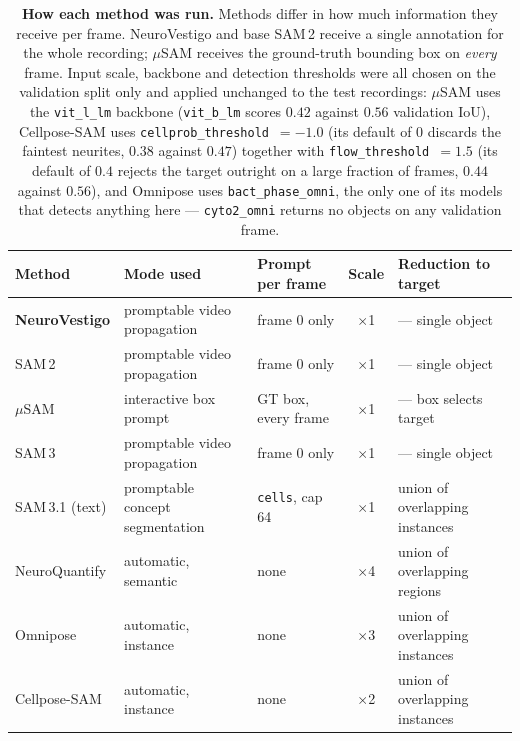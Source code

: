 \documentclass[11pt,a4paper]{article}
\begin{document}
\begin{table}[!htb]
\centering
\caption{\textbf{How each method was run.} Methods differ in how much
information they receive per frame. NeuroVestigo and base SAM\,2 receive a
single annotation for the whole recording; $\mu$SAM receives the
ground-truth bounding box on \emph{every} frame. Input scale, backbone and
detection thresholds were all chosen on the validation split only and applied
unchanged to the test recordings: $\mu$SAM uses the \texttt{vit\_l\_lm}
backbone (\texttt{vit\_b\_lm} scores $0.42$ against $0.56$ validation IoU),
Cellpose-SAM uses \texttt{cellprob\_threshold}~$=-1.0$ (its default of $0$
discards the faintest neurites, $0.38$ against $0.47$) together with
\texttt{flow\_threshold}~$=1.5$ (its default of $0.4$ rejects the target
outright on a large fraction of frames, $0.44$ against $0.56$), and Omnipose
uses
\texttt{bact\_phase\_omni}, the only one of its models that detects anything
here --- \texttt{cyto2\_omni} returns no objects on any validation frame.}
\label{tab:protocol}
\small
\begin{tabular}{l L{2.9cm} L{2.8cm} c L{3.2cm}}
\toprule
Method & Mode used & Prompt per frame & Scale & Reduction to target \\
\midrule
\textbf{NeuroVestigo}      & promptable video propagation & frame 0 only        & $\times$1 & --- single object \\
SAM\,2             & promptable video propagation & frame 0 only        & $\times$1 & --- single object \\
$\mu$SAM           & interactive box prompt       & GT box, every frame & $\times$1 & --- box selects target \\
SAM\,3             & promptable video propagation & frame 0 only        & $\times$1 & --- single object \\
SAM\,3.1 (text)    & promptable concept segmentation & \texttt{cells}, cap 64 & $\times$1 & union of overlapping instances \\
NeuroQuantify      & automatic, semantic          & none                & $\times$4 & union of overlapping regions \\
Omnipose           & automatic, instance          & none                & $\times$3 & union of overlapping instances \\
Cellpose-SAM       & automatic, instance          & none                & $\times$2 & union of overlapping instances \\
\bottomrule
\end{tabular}
\end{table}
\end{document}
